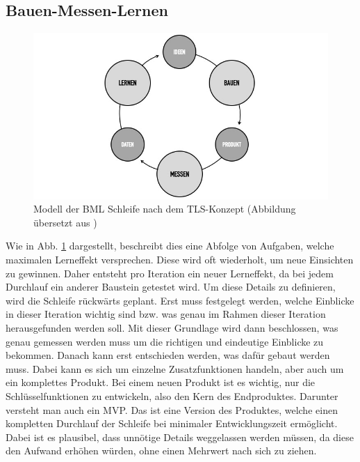 \subsection*{\label{sec:LeanStartup-BML}\thesubsection\quad Bauen-Messen-Lernen}
\begin{figure}
	\begin{center}
		\includegraphics[scale=0.5]{99_IMG/02_Grundlagen/buildmeasurelearn.jpg}
		\caption[Modell der \ac{BML} Schleife nach dem \ac{TLS}-Konzept]{Modell der \ac{BML} Schleife nach dem \ac{TLS}-Konzept (Abbildung übersetzt aus )}
		\label{fig:LeanStartup_BuildMeasureLearn}
	\end{center}
\end{figure}
Wie in Abb. \ref{fig:LeanStartup_BuildMeasureLearn} dargestellt, beschreibt dies eine Abfolge von Aufgaben, welche maximalen Lerneffekt versprechen. Diese wird oft wiederholt, um neue Einsichten zu gewinnen. Daher entsteht pro Iteration ein neuer Lerneffekt, da bei jedem Durchlauf ein anderer Baustein getestet wird. Um diese Details zu definieren, wird die Schleife rückwärts geplant. Erst muss festgelegt werden, welche Einblicke in dieser Iteration wichtig sind bzw. was genau im Rahmen dieser Iteration herausgefunden werden soll. Mit dieser Grundlage wird dann beschlossen, was genau gemessen werden muss um die richtigen und eindeutige Einblicke zu bekommen. Danach kann erst entschieden werden, was dafür gebaut werden muss. Dabei kann es sich um einzelne Zusatzfunktionen handeln, aber auch um ein komplettes Produkt. Bei einem neuen Produkt ist es wichtig, nur die Schlüsselfunktionen zu entwickeln, also den Kern des Endproduktes. Darunter versteht man auch ein \ac{MVP}. Das ist eine Version des Produktes, welche einen kompletten Durchlauf der Schleife bei minimaler Entwicklungszeit ermöglicht. Dabei ist es plausibel, dass unnötige Details weggelassen werden müssen, da diese den Aufwand erhöhen würden, ohne einen Mehrwert nach sich zu ziehen.


